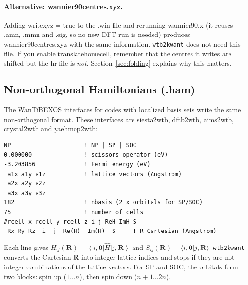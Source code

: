 \documentclass[11pt,a4paper]{article}
\newcommand{\code}[1]{{\ttfamily\def\_{\textunderscore\allowbreak}\def\slash{/\allowbreak}#1}}
\newcommand{\wtb}{WanTiBEXOS}
\newcommand{\tool}{\texttt{wtb2kwant}}
\newcommand{\ket}[1]{\left|#1\right\rangle}
\newcommand{\bra}[1]{\left\langle#1\right|}
\begin{document}
\paragraph{Alternative: \code{wannier90\_centres.xyz}.}
Adding \code{write\_xyz = true} to the \code{.win} file and rerunning \code{wannier90.x}
(it reuses \code{.amn}, \code{.mmn} and \code{.eig}, so no new DFT run is needed) produces
\code{wannier90\_centres.xyz} with the same information. \tool{} does not need this file.
If you enable \code{translate\_home\_cell}, remember that the centres it writes are shifted
but the \code{hr} file is \emph{not}. Section~\ref{sec:folding} explains why this matters.

\subsection{Non-orthogonal Hamiltonians (\code{.ham})}\label{sec:ham}
The \wtb{} interfaces for codes with localized basis sets write the same non-orthogonal
format. These interfaces are \code{siesta2wtb}, \code{dftb2wtb}, \code{aims2wtb},
\code{crystal2wtb} and \code{yaehmop2wtb}:
\begin{lstlisting}
NP                     ! NP | SP | SOC
0.000000               ! scissors operator (eV)
-3.203856              ! Fermi energy (eV)
 a1x a1y a1z           ! lattice vectors (Angstrom)
 a2x a2y a2z
 a3x a3y a3z
182                    ! nbasis (2 x orbitals for SP/SOC)
75                     ! number of cells
#rcell_x rcell_y rcell_z i j ReH ImH S
 Rx Ry Rz  i  j  Re(H)  Im(H)  S     ! R Cartesian (Angstrom)
\end{lstlisting}
Each line gives $H_{ij}(\mathbf{R})=\bra{i,\mathbf{0}}\hat H\ket{j,\mathbf{R}}$ and
$S_{ij}(\mathbf{R})=\langle i,\mathbf{0}|j,\mathbf{R}\rangle$. \tool{} converts the
Cartesian $\mathbf{R}$ into integer lattice indices and stops if they are not integer
combinations of the lattice vectors. For SP and SOC, the orbitals form two blocks:
spin up ($1\ldots n$), then spin down ($n+1\ldots 2n$).
\end{document}
